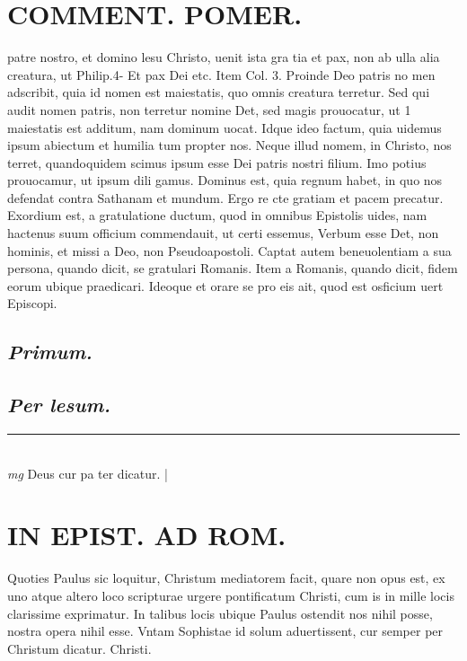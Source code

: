 \documentclass{article}
\begin{document}
\begin{pages}
\section*{COMMENT. POMER.  }\pstart patre nostro, et domino lesu Christo, uenit ista gra tia et pax, non ab ulla alia creatura, ut Philip.4- Et pax Dei etc. Item Col. 3. Proinde Deo patris no men adscribit, quia id nomen est maiestatis, quo omnis creatura terretur. Sed qui audit nomen patris, non terretur nomine Det, sed magis prouocatur, ut  1  maiestatis est additum, nam dominum uocat. Idque  ideo factum, quia uidemus ipsum abiectum et humilia tum propter nos. Neque illud nomem, in Christo, nos terret, quandoquidem scimus ipsum esse Dei patris nostri filium. Imo potius prouocamur, ut ipsum dili gamus. Dominus est, quia regnum habet, in quo nos defendat contra Sathanam et mundum. Ergo re cte gratiam et pacem precatur.   \pend\pstart Exordium est, a gratulatione ductum, quod in omnibus Epistolis uides, nam hactenus suum officium commendauit, ut certi essemus, Verbum esse Det, non hominis, et missi a Deo, non Pseudoapostoli. Captat autem beneuolentiam a sua persona, quando dicit, se gratulari Romanis. Item a Romanis, quando dicit, fidem eorum ubique  praedicari. Ideoque et orare se pro eis ait, quod est osficium uert Episcopi.   \pend
{}
{}
\subsection*{\textit{Primum. }}
{}
\subsection*{\textit{Per lesum. }}
\vspace{0.5cm}\noindent
\vspace{0.2cm}\rule{1cm}{0.2pt}\\ 
\hspace{0.2cm}\textit{mg}
\footnotesize Deus cur pa ter dicatur. 
\normalsize| 
\section*{IN EPIST. AD ROM.  }
\marginpar{[ p.]}\pstart Quoties Paulus sic loquitur, Christum mediatorem facit, quare non opus est, ex uno atque altero loco scripturae urgere pontificatum Christi, cum is in mille locis clarissime exprimatur. In talibus locis ubique Paulus ostendit nos nihil posse, nostra opera nihil esse. Vntam Sophistae id solum aduertissent, cur semper per Christum dicatur. Christi.  \pend
{}
{}

\end{pages}
\end{document}

